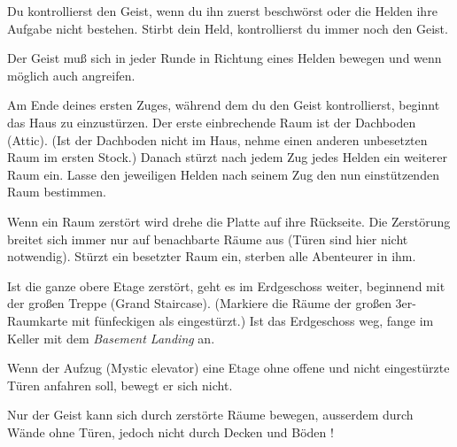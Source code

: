 \newpage



  \begin{itemize}
        \bitem Du kontrollierst den Geist, wenn du ihn zuerst beschwörst oder die Helden ihre Aufgabe nicht bestehen. Stirbt dein Held, kontrollierst du immer noch den Geist.

        \bitem Der Geist muß sich in jeder Runde in Richtung eines Helden bewegen und wenn möglich auch angreifen.

        \bitem Am Ende deines ersten Zuges, während dem du den Geist kontrollierst, beginnt das Haus zu einzustürzen. Der erste einbrechende Raum ist der Dachboden (Attic). (Ist der Dachboden nicht im Haus, nehme einen anderen unbesetzten Raum im ersten Stock.) Danach stürzt nach jedem Zug jedes Helden ein weiterer Raum ein. Lasse den jeweiligen Helden nach seinem Zug den nun einstützenden Raum bestimmen.

        \bitem Wenn ein Raum zerstört wird drehe die Platte auf ihre Rückseite. Die Zerstörung breitet sich immer nur auf benachbarte Räume aus (Türen sind hier nicht notwendig). Stürzt ein besetzter Raum ein,  sterben alle Abenteurer in ihm.

        \bitem Ist die ganze obere Etage zerstört, geht es im Erdgeschoss weiter, beginnend mit der großen Treppe (Grand Staircase). (Markiere die Räume der großen 3er-Raumkarte mit fünfeckigen  als eingestürzt.) Ist das Erdgeschoss weg, fange im Keller mit dem \emph{Basement Landing} an.

        \bitem Wenn der Aufzug (Mystic elevator) eine Etage ohne offene und nicht eingestürzte Türen anfahren soll, bewegt er sich nicht.

        \bitem Nur der Geist kann sich durch zerstörte Räume bewegen, ausserdem durch Wände ohne Türen, jedoch nicht durch Decken und Böden !
    \end{itemize}


